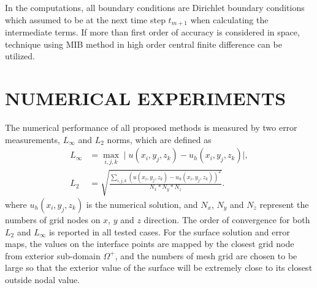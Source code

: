 \documentclass[dissertation]{uathesis}
\begin{document}
\begin{body}
In the computations, all boundary conditions are Dirichlet boundary conditions which assumed to be at the next time step $t_{m+1}$ when calculating the intermediate terms. If more than first order of accuracy is considered in space, technique \cite{zhao2009matched} using MIB method in high order central finite difference can be utilized.


\chapter{\MakeUppercase{Numerical experiments}}

The numerical performance of all proposed methods is measured by two error measurements, $L_{\infty}$ and $L_2$ norms, which are defined as 
\begin{align}
L_{\infty} &= \max_{i,j,k} \mid u(x_{i},y_{j},z_{k}) - u_h(x_{i},y_{j},z_{k})\mid,  \\
L_2 &= \sqrt{\frac{\sum_{i,j,k} (u(x_{i},y_{j},z_{k}) - u_h(x_{i},y_{j},z_{k}))^2}{N_{x}*N_{y}*N_{z}}}.
\end{align}
where $u_h(x_{i},y_{j},z_{k})$ is the numerical solution, and
$N_{x}$, $N_{y}$ and $N_{z}$ represent the numbers of grid nodes on $x$, $y$ and $z$ direction. The order of convergence for both $L_2$ and $L_{\infty}$ is reported in all tested cases. For the surface solution and error maps, the values on the interface points are mapped by the closest grid node from exterior sub-domain $\Omega^{+}$, and the numbers of mesh grid are chosen to be large so that the exterior value of the surface will be extremely close to its closest outside nodal value.


\end{body}
\end{document}
